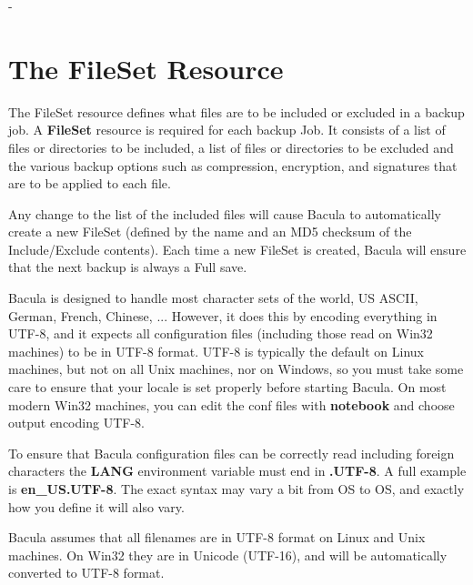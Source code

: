 -%

\section{The FileSet Resource}
\label{FileSetResource}

The FileSet resource defines what files are to be included or excluded in a
backup job.  A {\bf FileSet} resource is required for each backup Job.  It
consists of a list of files or directories to be included, a list of files
or directories to be excluded and the various backup options such as
compression, encryption, and signatures that are to be applied to each
file.

Any change to the list of the included files will cause Bacula to
automatically create a new FileSet (defined by the name and an MD5 checksum
of the Include/Exclude contents).  Each time a new FileSet is created,
Bacula will ensure that the next backup is always a Full save.

Bacula is designed to handle most character sets of the world,
US ASCII, German, French, Chinese, ...  However, it does this by
encoding everything in UTF-8, and it expects all configuration files
(including those read on Win32 machines) to be in UTF-8 format.
UTF-8 is typically the default on Linux machines, but not on all
Unix machines, nor on Windows, so you must take some care to ensure
that your locale is set properly before starting Bacula.  
On most modern Win32 machines, you can edit the conf files with {\bf
notebook} and choose output encoding UTF-8.

To ensure that Bacula configuration files can be correctly read including
foreign characters the {\bf LANG} environment variable
must end in {\bf .UTF-8}. A full example is {\bf en\_US.UTF-8}. The
exact syntax may vary a bit from OS to OS, and exactly how you define
it will also vary.

Bacula assumes that all filenames are in UTF-8 format on Linux and
Unix machines. On Win32 they are in Unicode (UTF-16), and will
be automatically converted to UTF-8 format.


